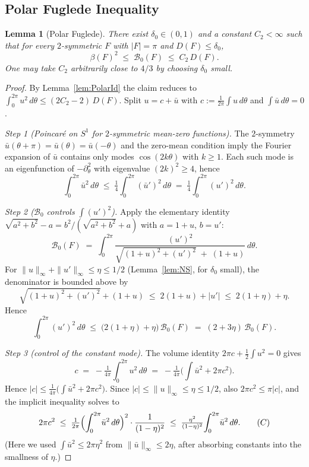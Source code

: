 \documentclass[11pt]{article}
\newtheorem{lemma}[theorem]{Lemma}
\newcommand{\B}{\mathcal{B}}
\begin{document}
\subsection{Polar Fuglede Inequality}
\begin{lemma}[Polar Fuglede] \label{lem:Fug}
There exist $\delta_0\in(0,1)$ and a constant $C_2<\infty$ such that for every $2$-symmetric $F$ with $|F|=\pi$ and $D(F)\le\delta_0$,
\[ \beta(F)^2 \;\le\; \B_0(F) \;\le\; C_2\,D(F). \]
One may take $C_2$ arbitrarily close to $4/3$ by choosing $\delta_0$ small.
\end{lemma}
\begin{proof}
By Lemma~\ref{lem:PolarId} the claim reduces to $\int_0^{2\pi}\!u^2\,d\theta \le (2C_2-2)\,D(F)$. Split $u = c + \bar u$ with $c := \tfrac{1}{2\pi}\!\int u\,d\theta$ and $\int \bar u\,d\theta = 0$.

\smallskip
\emph{Step 1 (Poincar\'e on $S^1$ for $2$-symmetric mean-zero functions).} The $2$-symmetry $\bar u(\theta+\pi)=\bar u(\theta)=\bar u(-\theta)$ and the zero-mean condition imply the Fourier expansion of $\bar u$ contains only modes $\cos(2k\theta)$ with $k\ge 1$. Each such mode is an eigenfunction of $-\partial_\theta^2$ with eigenvalue $(2k)^2 \ge 4$, hence
\[
  \int_0^{2\pi}\!\bar u^2\,d\theta \;\le\; \tfrac{1}{4}\!\int_0^{2\pi}\!(\bar u')^2\,d\theta \;=\; \tfrac{1}{4}\!\int_0^{2\pi}\!(u')^2\,d\theta. \tag{$P$}
\]

\smallskip
\emph{Step 2 ($\B_0$ controls $\int(u')^2$).} Apply the elementary identity $\sqrt{a^2+b^2}-a = b^2/(\sqrt{a^2+b^2}+a)$ with $a=1+u$, $b=u'$:
\[
  \B_0(F) \;=\; \int_0^{2\pi} \frac{(u')^2}{\sqrt{(1+u)^2+(u')^2} \;+\; (1+u)}\,d\theta.
\]
For $\|u\|_\infty + \|u'\|_\infty \le \eta \le 1/2$ (Lemma~\ref{lem:NS}, for $\delta_0$ small), the denominator is bounded above by
\[
  \sqrt{(1+u)^2+(u')^2} + (1+u) \;\le\; 2(1+u) + |u'| \;\le\; 2(1+\eta) + \eta.
\]
Hence
\[
  \int_0^{2\pi}(u')^2\,d\theta \;\le\; \bigl(2(1+\eta)+\eta\bigr)\,\B_0(F) \;=\; (2+3\eta)\,\B_0(F). \tag{$U$}
\]

\smallskip
\emph{Step 3 (control of the constant mode).} The volume identity $2\pi c + \tfrac12\int u^2 = 0$ gives
\[
  c \;=\; -\tfrac{1}{4\pi}\!\int_0^{2\pi}\! u^2\,d\theta \;=\; -\tfrac{1}{4\pi}\bigl(\int\bar u^2 + 2\pi c^2\bigr).
\]
Hence $|c| \le \tfrac{1}{4\pi}\bigl(\int\bar u^2 + 2\pi c^2\bigr)$. Since $|c|\le \|u\|_\infty\le\eta\le 1/2$, also $2\pi c^2 \le \pi |c|$, and the implicit inequality solves to
\[
  2\pi c^2 \;\le\; \tfrac{1}{2\pi}\Bigl(\int_0^{2\pi}\!\bar u^2\,d\theta\Bigr)^2 \cdot \frac{1}{(1-\eta)^2} \;\le\; \tfrac{\eta^2}{(1-\eta)^2}\!\int_0^{2\pi}\!\bar u^2\,d\theta. \tag{$C$}
\]
(Here we used $\int\bar u^2 \le 2\pi\eta^2$ from $\|\bar u\|_\infty \le 2\eta$, after absorbing constants into the smallness of $\eta$.)


\end{proof}
\end{document}
